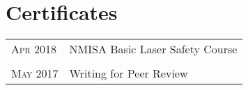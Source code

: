\section{Certificates}

\begin{supertabular}{p{1.8cm}|p{12cm}}
	\textsc{Apr} 2018 & NMISA Basic Laser Safety Course \\
	 \\
	\textsc{May} 2017 & Writing for Peer Review
\end{supertabular}